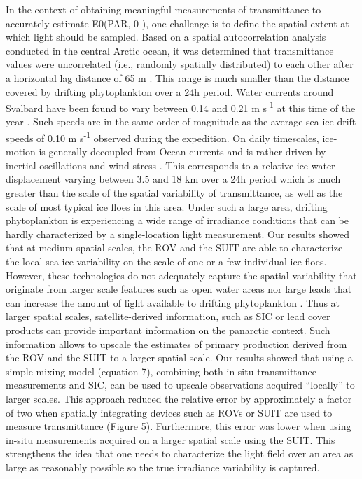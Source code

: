 \documentclass[draft]{agujournal2018}
\begin{document}
In the context of obtaining meaningful measurements of transmittance to accurately estimate E0(PAR, 0-), one challenge is to define the spatial extent at which light should be sampled. Based on a spatial autocorrelation analysis conducted in the central Arctic ocean, it was determined that transmittance values were uncorrelated (i.e., randomly spatially distributed) to each other after a horizontal lag distance of 65 m \citep{Lange2017b}. This range is much smaller than the distance covered by drifting phytoplankton over a 24h period. Water currents around Svalbard have been found to vary between 0.14 and 0.21 m s\textsuperscript{-1} at this time of the year \citep{Meyer2017}. Such speeds are in the same order of magnitude as  the average sea ice drift speeds of 0.10 m s\textsuperscript{-1} observed during the expedition. On daily timescales, ice-motion is generally decoupled from Ocean currents and is rather driven by inertial oscillations and wind stress \citep{Park2016}. This corresponds to a relative ice-water displacement varying between 3.5 and 18 km over a 24h period which is much greater than the scale of the spatial variability of transmittance, as well as the scale of most typical ice floes in this area. Under such a large area, drifting phytoplankton is experiencing a wide range of irradiance conditions that can be hardly characterized by a single-location light measurement. Our results showed that at medium spatial scales, the ROV and the SUIT are able to characterize the local sea-ice variability on the scale of one or a few individual ice floes. However, these technologies do not adequately capture the spatial variability that originate from larger scale features such as open water areas nor large leads that can increase the amount of light available to drifting phytoplankton \citep{Assmy2017}. Thus at larger spatial scales, satellite-derived information, such as SIC or lead cover products can provide important information on the panarctic context. Such information allows to upscale the estimates of primary production derived from the ROV and the SUIT to a larger spatial scale. Our results showed that using a simple mixing model (equation 7), combining both in-situ transmittance measurements and SIC, can be used to upscale observations acquired “locally” to larger scales. This approach reduced the relative error by approximately a factor of two when spatially integrating devices such as ROVs or SUIT are used to measure transmittance (Figure 5). Furthermore, this error was lower when using in-situ measurements acquired on a larger spatial scale using the SUIT. This strengthens the idea that one needs to characterize the light field over an area as large as reasonably possible so the true irradiance variability is captured.
\end{document}
